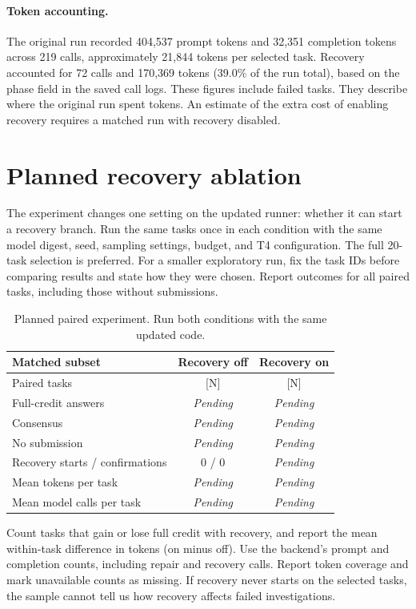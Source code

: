 \documentclass[11pt,a4paper,twocolumn]{article}
\newcommand{\pending}{\textit{Pending}}
\begin{document}
\paragraph{Token accounting.} The original run recorded 404,537 prompt tokens and 32,351 completion tokens across 219 calls, approximately 21,844 tokens per selected task. Recovery accounted for 72 calls and 170,369 tokens (39.0\% of the run total), based on the phase field in the saved call logs. These figures include failed tasks. They describe where the original run spent tokens. An estimate of the extra cost of enabling recovery requires a matched run with recovery disabled.

\section{Planned recovery ablation}
The experiment changes one setting on the updated runner: whether it can start a recovery branch. Run the same tasks once in each condition with the same model digest, seed, sampling settings, budget, and T4 configuration. The full 20-task selection is preferred. For a smaller exploratory run, fix the task IDs before comparing results and state how they were chosen. Report outcomes for all paired tasks, including those without submissions.

\begin{table}[ht]
\centering\small
\begin{tabularx}{\columnwidth}{@{}Xcc@{}}
\toprule
Matched subset & Recovery off & Recovery on \\
\midrule
Paired tasks & [N] & [N] \\
Full-credit answers & \pending & \pending \\
Consensus & \pending & \pending \\
No submission & \pending & \pending \\
Recovery starts / confirmations & 0 / 0 & \pending \\
Mean tokens per task & \pending & \pending \\
Mean model calls per task & \pending & \pending \\
\bottomrule
\end{tabularx}
\caption{Planned paired experiment. Run both conditions with the same updated code.}
\end{table}

Count tasks that gain or lose full credit with recovery, and report the mean within-task difference in tokens (on minus off). Use the backend's prompt and completion counts, including repair and recovery calls. Report token coverage and mark unavailable counts as missing. If recovery never starts on the selected tasks, the sample cannot tell us how recovery affects failed investigations.
\end{document}

